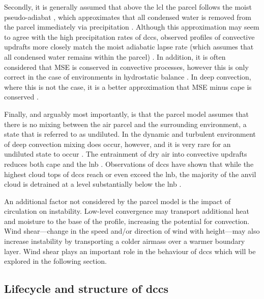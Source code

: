 Secondly, it is generally assumed that above the \acrshort{lcl} the parcel follows the moist pseudo-adiabat \citep{peters_generalized_2022}, which approximates that all condensed water is removed from the parcel immediately via precipitation \citep{emanuel_atmospheric_1994}. 
Although this approximation may seem to agree with the high precipitation rates of \acrshort{dcc}s, observed profiles of convective updrafts more closely match the moist adiabatic lapse rate (which assumes that all condensed water remains within the parcel) \citep{xu_is_1989}. 
In addition, it is often considered that MSE is conserved in convective processes, however this is only correct in the case of environments in hydrostatic balance \citep{peters_evaluating_2021}. 
In deep convection, where this is not the case, it is a better approximation that MSE minus \acrshort{cape} is conserved \citep{romps_mse_2015}.

Finally, and arguably most importantly, is that the parcel model assumes that there is no mixing between the air parcel and the surrounding environment, a state that is referred to as undiluted. 
In the dynamic and turbulent environment of deep convection mixing does occur, however, and it is very rare for an undiluted state to occur \citep{romps_undiluted_2010}. 
The entrainment of dry air into convective updrafts reduces both \acrshort{cape} \citep{zhang_effects_2009} and the \acrshort{lnb} \citep{masunaga_convective_2016}. 
Observations of \acrshort{dcc}s have shown that while the highest cloud tops of \acrshort{dcc}s reach or even exceed the \acrshort{lnb}, the majority of the anvil cloud is detrained at a level substantially below the \acrshort{lnb} \citep{takahashi_where_2012, takahashi_level_2017}.

An additional factor not considered by the parcel model is the impact of circulation on instability.
Low-level convergence may transport additional heat and moisture to the base of the profile, increasing the potential for convection.
Wind shear---change in the speed and/or direction of wind with height---may also increase instability by transporting a colder airmass over a warmer boundary layer.
Wind shear plays an important role in the behaviour of \acrshort{dcc}s which will be explored in the following section.

\subsection{Lifecycle and structure of \acrshort{dcc}s}

